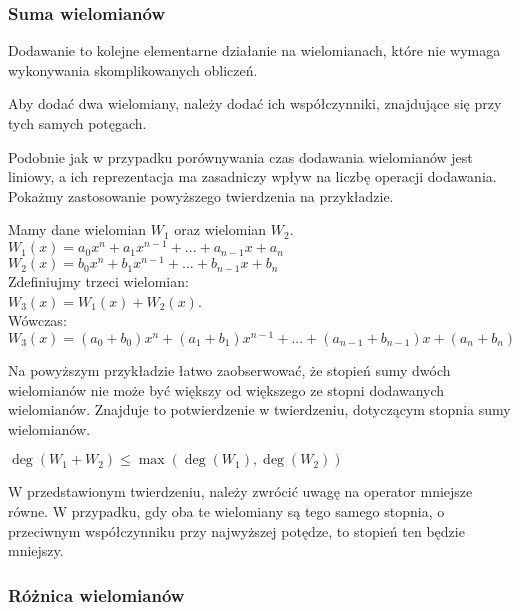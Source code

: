 \subsubsection{Suma wielomianów}

Dodawanie to kolejne elementarne działanie na wielomianach, które nie wymaga wykonywania skomplikowanych obliczeń.

\begin{theorem}
	$ $\\
	Aby dodać dwa wielomiany, należy dodać ich współczynniki, znajdujące się przy tych samych potęgach.
\end{theorem}

Podobnie jak w przypadku porównywania czas dodawania wielomianów jest liniowy, a ich reprezentacja ma zasadniczy wpływ na liczbę operacji dodawania. Pokażmy zastosowanie powyższego twierdzenia na przykładzie.

\begin{example}
	$ $\\
	Mamy dane wielomian $W_1$ oraz wielomian $W_2$. \\
	$W_1(x) = a_0x^n + a_1x^{n-1} + ... + a_{n-1}x + a_n$ \\
	$W_2(x) = b_0x^n + b_1x^{n-1} + ... + b_{n-1}x + b_n$ \\
	Zdefiniujmy trzeci wielomian: \\
	$W_3(x) = W_1(x) + W_2(x)$. \\
	Wówczas: \\
	$W_3(x) = (a_0+b_0)x^n + (a_1+b_1)x^{n-1} + ... + (a_{n-1} + b_{n-1})x + (a_n + b_n)$
\end{example}

Na powyższym przykładzie łatwo zaobserwować, że stopień sumy dwóch wielomianów nie może być większy od większego ze stopni dodawanych wielomianów. Znajduje to potwierdzenie w twierdzeniu, dotyczącym stopnia sumy wielomianów.

\begin{theorem}
	$ $\\
	$\deg(W_1 + W_2) \le \max(\deg(W_1),\deg (W_2))$
\end{theorem}

W przedstawionym twierdzeniu, należy zwrócić uwagę na operator mniejsze równe. W przypadku, gdy oba te wielomiany są tego samego stopnia, o przeciwnym współczynniku przy najwyższej potędze, to stopień ten będzie mniejszy.

\subsubsection{Różnica wielomianów}

